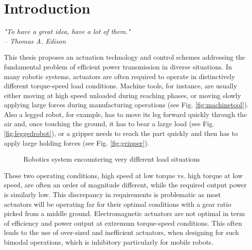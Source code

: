 \chapter{Introduction}
\label{sec:Introduction}

{
\begin{flushright}
\textit{"To have a great idea, have a lot of them."} \\
\emph{-- Thomas A. Edison}
\end{flushright}
}
\vspace{10pt}


This thesis proposes an actuation technology and control schemes addressing the fundamental problem of efficient power transmission in diverse situations. In many robotic systems, actuators are often required to operate in distinctively different torque-speed load conditions. Machine tools, for instance, are usually either moving at high speed unloaded during reaching phases, or moving slowly applying large forces during manufacturing operations (see Fig. \ref{fig:machinetool}). Also a legged robot, for example, has to move its leg forward quickly through the air and, once touching the ground, it has to bear a large load (see Fig. \ref{fig:leggedrobot}), or a gripper needs to reach the part quickly and then has to apply large holding forces (see Fig. \ref{fig:gripper}).
%
\begin{figure}[H]
        \centering
        \caption{Robotics system encountering very different load situations}
				\label{fig:app}
\end{figure}

These two operating conditions, high speed at low torque vs. high torque at low speed, are often an order of magnitude different, while the required output power is similarly low. This discrepancy in requirements is problematic as most actuators will be operating far for their optimal conditions with a gear ratio picked from a middle ground. Electromagnetic actuators are not optimal in term of efficiency and power output at extremum torque-speed conditions. This often leads to the use of over-sized and inefficient actuators, when designing for such bimodal operations, which is inhibitory particularly for mobile robots.



